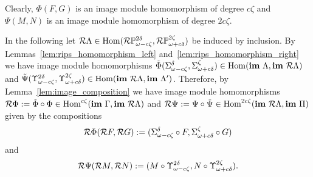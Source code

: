 Clearly, $\Phi(F, G)$ is an image module homomorphism of degree $c\zeta$ and $\Psi(M, N)$ is an image module homomorphism of degree $2c\zeta$.

In the following let $\mathcal{R}\Lambda\in\mathrm{Hom}(\mathcal{R}\mathbb{P}_{\omega-c\zeta}^{2\delta},\mathcal{R}\mathbb{P}_{\omega+c\delta}^{2\zeta})$ be induced by inclusion.
By Lemmas~\ref{lem:rips_homomorphism_left} and~\ref{lem:rips_homomorphism_right} we have image module homomorphisms $\tilde{\Phi}(\Sigma_{\omega-c\zeta}^\delta, \Sigma_{\omega+c\delta}^\zeta)\in\mathrm{Hom}(\mathbf{im}~\Lambda, \mathbf{im}~\mathcal{R}\Lambda)$ and $\tilde{\Psi}(\Upsilon_{\omega-c\zeta}^{2\delta}, \Upsilon_{\omega+c\delta}^{2\zeta})\in\mathrm{Hom}(\mathbf{im}~\mathcal{R}\Lambda,\mathbf{im}~\Lambda')$.
Therefore, by Lemma~\ref{lem:image_composition} we have image module homomorphisms $\mathcal{R}\Phi := \tilde{\Phi}\circ\Phi\in\mathrm{Hom}^{c\zeta}(\mathbf{im}~\Gamma,\mathbf{im}~\mathcal{R}\Lambda)$ and $\mathcal{R}\Psi :=\Psi\circ\tilde{\Psi}\in\mathrm{Hom}^{2c\zeta}(\mathbf{im}~\mathcal{R}\Lambda, \mathbf{im}~\Pi)$ given by the compositions
\[ \mathcal{R}\Phi(\mathcal{R} F, \mathcal{R} G) := (\Sigma_{\omega-c\zeta}^\delta\circ F, \Sigma_{\omega+c\delta}^\zeta\circ G)\]
and
\[ \mathcal{R}\Psi(\mathcal{R} M, \mathcal{R} N) := (M\circ \Upsilon_{\omega-c\zeta}^{2\delta}, N\circ\Upsilon_{\omega+c\delta}^{2\zeta}).\]


